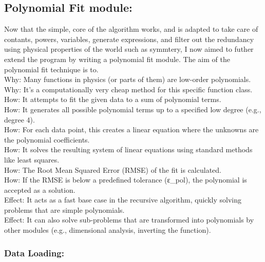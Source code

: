 \documentclass{article}
\begin{document}
\subsection{Polynomial Fit module: }

Now that the simple, core of the algorithm works, and is adapted to take care of contants, powers, variables, generate expressions, and filter out the redundancy using physical properties of the world such as symmtery, I now aimed to futher extend the program by writing a polynomial fit module. The aim of the polynomial fit technique is to.\\

    Why: Many functions in physics (or parts of them) are low-order polynomials.\\

    Why: It's a computationally very cheap method for this specific function class.\\

    How: It attempts to fit the given data to a sum of polynomial terms.\\

    How: It generates all possible polynomial terms up to a specified low degree (e.g., degree 4).\\

    How: For each data point, this creates a linear equation where the unknowns are the polynomial coefficients.\\

    How: It solves the resulting system of linear equations using standard methods like least squares.\\

    How: The Root Mean Squared Error (RMSE) of the fit is calculated.\\

    How: If the RMSE is below a predefined tolerance (ε_pol), the polynomial is accepted as a solution.\\

    Effect: It acts as a fast base case in the recursive algorithm, quickly solving problems that are simple polynomials.\\

    Effect: It can also solve sub-problems that are transformed into polynomials by other modules (e.g., dimensional analysis, inverting the function).\\

\subsubsection{Data Loading:}
\end{document}
